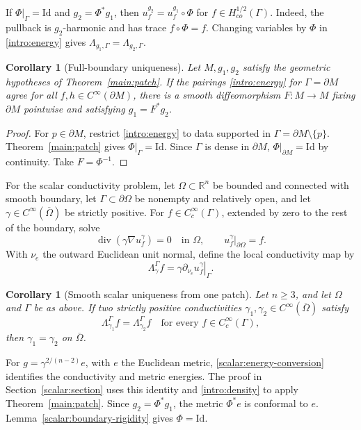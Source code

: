 \documentclass[11pt,a4paper]{article}
\newtheorem{corollary}[theorem]{Corollary}
\theoremstyle{definition}
\theoremstyle{remark}
\newcommand{\Id}{\mathrm{Id}}
\numberwithin{equation}{section}
\begin{document}
If $\Phi|_\Gamma=\Id$ and $g_2=\Phi^*g_1$, then
$u_f^{g_2}=u_f^{g_1}\circ\Phi$ for $f\in H^{1/2}_{co}(\Gamma)$.
Indeed, the pullback is $g_2$-harmonic and has trace $f\circ\Phi=f$.
Changing variables by $\Phi$ in \eqref{intro:energy} gives
$\Lambda_{g_1,\Gamma}=\Lambda_{g_2,\Gamma}$.

\begin{corollary}[Full-boundary uniqueness]\label{main:full}
Let $M,g_1,g_2$ satisfy the geometric hypotheses of
Theorem~\ref{main:patch}. If the pairings \eqref{intro:energy} for
$\Gamma=\partial M$ agree for all $f,h\in C^\infty(\partial M)$, there
is a smooth diffeomorphism $F:M\to M$ fixing $\partial M$ pointwise
and satisfying $g_1=F^*g_2$.
\end{corollary}

\begin{proof}
For $p\in\partial M$, restrict \eqref{intro:energy} to data supported
in $\Gamma=\partial M\setminus\{p\}$. Theorem~\ref{main:patch} gives
$\Phi|_\Gamma=\Id$. Since $\Gamma$ is dense in $\partial M$,
$\Phi|_{\partial M}=\Id$ by continuity. Take $F=\Phi^{-1}$.
\end{proof}

For the scalar conductivity problem, let
$\Omega\subset\mathbb R^n$ be bounded and connected with smooth
boundary, let $\Gamma\subset\partial\Omega$ be nonempty and relatively
open, and let $\gamma\in C^\infty(\overline\Omega)$ be strictly
positive.  For $f\in C_c^\infty(\Gamma)$, extended by zero to the
rest of the boundary, solve
\[
 \operatorname{div}(\gamma\nabla u_f^\gamma)=0\quad\text{in }\Omega,
 \qquad u_f^\gamma|_{\partial\Omega}=f.
\]
With $\nu_e$ the outward Euclidean unit normal, define the local
conductivity map by
\[
 \Lambda_\gamma^\Gamma f
       =\left.\gamma\partial_{\nu_e}u_f^\gamma\right|_\Gamma.
\]

\begin{corollary}[Smooth scalar uniqueness from one patch]
\label{main:scalar}
Let $n\ge3$, and let $\Omega$ and $\Gamma$ be as above.  If two
strictly positive conductivities
$\gamma_1,\gamma_2\in C^\infty(\overline\Omega)$ satisfy
\[
 \Lambda_{\gamma_1}^\Gamma f=\Lambda_{\gamma_2}^\Gamma f
       \quad\text{for every }f\in C_c^\infty(\Gamma),
\]
then $\gamma_1=\gamma_2$ on $\overline\Omega$.
\end{corollary}

For $g=\gamma^{2/(n-2)}e$, with $e$ the Euclidean metric,
\eqref{scalar:energy-conversion} identifies the conductivity and metric
energies. The proof in Section~\ref{scalar:section} uses this identity
and \eqref{intro:density} to apply Theorem~\ref{main:patch}.
Since $g_2=\Phi^*g_1$, the metric $\Phi^*e$ is conformal to $e$.
Lemma~\ref{scalar:boundary-rigidity} gives $\Phi=\Id$.
\end{document}
